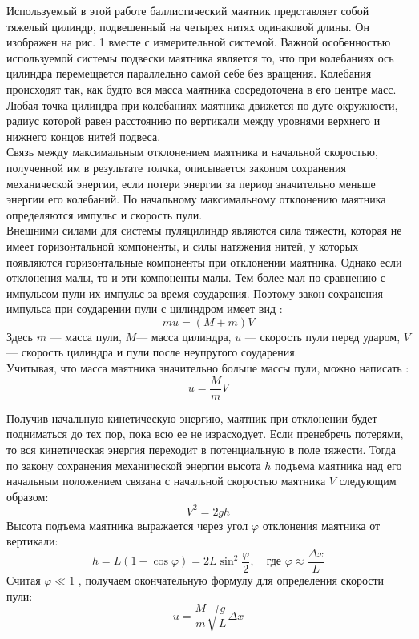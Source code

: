 \documentclass[11pt]{article}
\begin{document}
    \small{
    Используемый в этой работе баллистический маятник представляет собой тяжелый цилиндр, подвешенный на четырех нитях одинаковой длины. Он изображен на рис. 1 вместе с измерительной системой. Важной особенностью используемой системы подвески маятника является то, что при колебаниях ось цилиндра перемещается параллельно самой себе без вращения. Колебания происходят так, как будто вся масса маятника сосредоточена в его центре масс. Любая точка цилиндра при колебаниях маятника движется по дуге окружности, радиус которой равен расстоянию по вертикали между уровнями верхнего и нижнего концов нитей подвеса.
    \\
    \indent Связь между максимальным отклонением маятника и начальной скоростью, полученной им в результате толчка, описывается законом сохранения механической энергии, если потери энергии за период значительно меньше энергии его колебаний. По начальному максимальному отклонению маятника определяются импульс и скорость пули.
    \\
    \indent Внешними силами для системы пуляцилиндр являются сила тяжести, которая не имеет горизонтальной компоненты, и силы натяжения нитей, у которых появляются горизонтальные компоненты при отклонении маятника. Однако если отклонения малы, то и эти компоненты малы. Тем более мал по сравнению с импульсом пули их импульс за время соударения. Поэтому закон сохранения импульса при соударении пули с цилиндром имеет вид :
    }
    \begin{equation}
        mu = (M + m) V   
    \end{equation}
    Здесь $m$ — масса пули, $M$— масса цилиндра, $u$ — скорость пули перед ударом, $V$ — скорость цилиндра и пули после неупругого соударения.\\
    \indent Учитывая, что масса маятника значительно больше массы пули, можно написать :
    \begin{equation}
        u = \frac{M}{m}V   
    \end{equation}

    \indent Получив начальную кинетическую энергию, маятник при отклонении будет подниматься до тех пор, пока всю ее не израсходует. Если пренебречь потерями, то вся кинетическая энергия переходит в потенциальную в поле тяжести. Тогда по закону сохранения механической энергии высота $h$ подъема маятника над его начальным положением связана с начальной скоростью маятника $V$ следующим образом:
    \begin{equation}
        V^2 = 2gh   
    \end{equation}
    \indent Высота подъема маятника выражается через угол $\varphi$ отклонения маятника от вертикали:
    \begin{equation}
        h = L(1 - \cos\varphi) = 2L\sin^2\frac{\varphi}{2}, \quad \text{где } \varphi \approx \frac{\Delta x}{L}  
    \end{equation}
    Считая $\varphi \ll 1$ , получаем окончательную формулу для определения скорости пули:
    \begin{equation}
    u = \frac{M}{m} \sqrt{\frac{g}{L}}\Delta x
    \end{equation}
\end{document}
